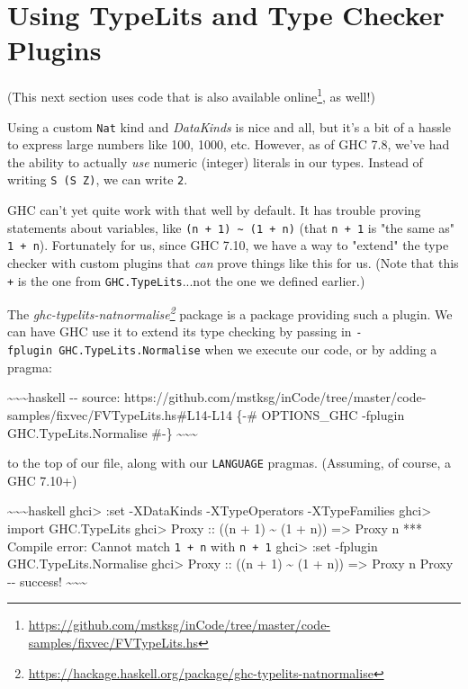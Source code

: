\documentclass[]{article}
\renewcommand{\href}[2]{#2\footnote{\url{#1}}}
\begin{document}
\section{Using TypeLits and Type Checker Plugins}

(This next section uses code that is
\href{https://github.com/mstksg/inCode/tree/master/code-samples/fixvec/FVTypeLits.hs}{also
available online}, as well!)

Using a custom \texttt{Nat} kind and \emph{DataKinds} is nice and all, but it's
a bit of a hassle to express large numbers like 100, 1000, etc. However, as of
GHC 7.8, we've had the ability to actually \emph{use} numeric (integer) literals
in our types. Instead of writing \texttt{S\ (S\ Z)}, we can write \texttt{2}.

GHC can't yet quite work with that well by default. It has trouble proving
statements about variables, like
\texttt{(n\ +\ 1)\ \textasciitilde{}\ (1\ +\ n)} (that \texttt{n\ +\ 1} is "the
same as" \texttt{1\ +\ n}). Fortunately for us, since GHC 7.10, we have a way to
"extend" the type checker with custom plugins that \emph{can} prove things like
this for us. (Note that this \texttt{+} is the one from
\texttt{GHC.TypeLits}...not the one we defined earlier.)

The
\emph{\href{https://hackage.haskell.org/package/ghc-typelits-natnormalise}{ghc-typelits-natnormalise}}
package is a package providing such a plugin. We can have GHC use it to extend
its type checking by passing in \texttt{-fplugin\ GHC.TypeLits.Normalise} when
we execute our code, or by adding a pragma:

\textasciitilde{}\textasciitilde{}\textasciitilde{}haskell -\/- source:
https://github.com/mstksg/inCode/tree/master/code-samples/fixvec/FVTypeLits.hs\#L14-L14
\{-\# OPTIONS\_GHC -fplugin GHC.TypeLits.Normalise \#-\}
\textasciitilde{}\textasciitilde{}\textasciitilde{}

to the top of our file, along with our \texttt{LANGUAGE} pragmas. (Assuming, of
course, a GHC 7.10+)

\textasciitilde{}\textasciitilde{}\textasciitilde{}haskell ghci\textgreater{}
:set -XDataKinds -XTypeOperators -XTypeFamilies ghci\textgreater{} import
GHC.TypeLits ghci\textgreater{} Proxy :: ((n + 1) \textasciitilde{} (1 + n))
=\textgreater{} Proxy n *** Compile error: Cannot match \texttt{1\ +\ n} with
\texttt{n\ +\ 1} ghci\textgreater{} :set -fplugin GHC.TypeLits.Normalise
ghci\textgreater{} Proxy :: ((n + 1) \textasciitilde{} (1 + n)) =\textgreater{}
Proxy n Proxy -\/- success! \textasciitilde{}\textasciitilde{}\textasciitilde{}
\end{document}
